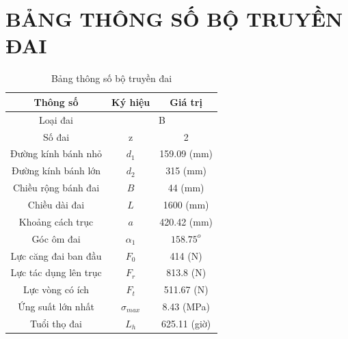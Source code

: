     \section{BẢNG THÔNG SỐ BỘ TRUYỀN ĐAI}
    \begin{table}[H]
        \centering
        \begin{tabular}{|c|c|c|}
            \hline
            \textbf{Thông số} & \textbf{Ký hiệu} & \textbf{Giá trị} \\ \hline
            Loại đai & \multicolumn{2}{c|}{B} \\ \hline
            Số đai & z & 2 \\ \hline
            Đường kính bánh nhỏ & $d_1$ & 159.09 (mm)\\ \hline
            Đường kính bánh lớn & $d_2$ & 315 (mm)\\ \hline
            Chiều rộng bánh đai & $B$ & 44 (mm)\\ \hline
            Chiều dài đai & $L$ & 1600 (mm) \\ \hline
            Khoảng cách trục & $a$ & 420.42 (mm) \\ \hline
            Góc ôm đai & $\alpha_1$ & $158.75^o$ \\ \hline
            Lực căng đai ban đầu & $F_0$ & 414 (N) \\ \hline
            Lực tác dụng lên trục & $F_r$ & 813.8 (N)  \\ \hline
            Lực vòng có ích & $F_t$ & 511.67 (N) \\ \hline
            Ứng suất lớn nhất & $\sigma_{max}$ & 8.43 (MPa) \\ \hline
            Tuổi thọ đai & $L_h$ & 625.11 (giờ) \\ \hline
        \end{tabular}
        \caption{Bảng thông số bộ truyền đai}
    \end{table}
        
        